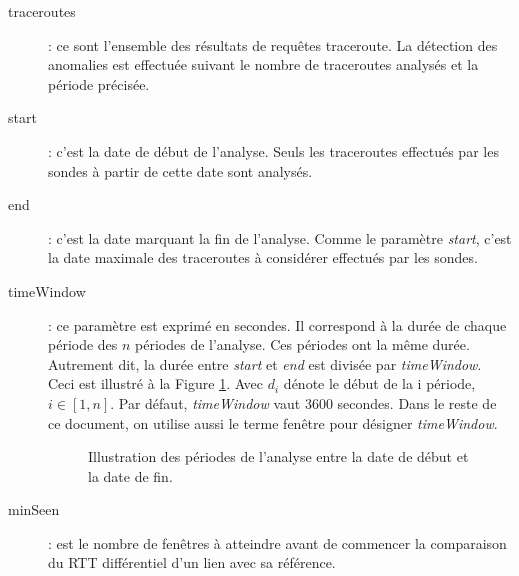 \begin{description}
	\item[traceroutes] : ce sont l'ensemble des résultats de requêtes traceroute. La détection des anomalies est effectuée suivant le nombre de traceroutes analysés et la période précisée. 
	\item[start] : c'est la date de début de l'analyse. Seuls les traceroutes effectués par les sondes  à partir de cette date sont analysés.
	\item[end]  : c'est la date marquant la fin de l'analyse. Comme le paramètre \textit{start}, c'est la date maximale des  traceroutes à considérer effectués par les sondes.
	\item[timeWindow]:  ce paramètre est exprimé en secondes. Il correspond à la durée de chaque période des $n$ périodes de l'analyse. Ces périodes ont la même durée. Autrement dit, la durée entre   \textit{start} et \textit{end} est divisée par \textit{timeWindow}. Ceci est illustré à la Figure  \ref{fig:timing_tex_}. Avec $d_i$ dénote le début de la i période,  $i \in [1,n]$. Par défaut, \textit{timeWindow} vaut $ 3600 $ secondes. Dans le reste de ce document, on utilise  aussi le terme fenêtre pour désigner \textit{timeWindow}.
	\begin{figure}[h]
		\centering
		\captionsetup{justification=centering}
		
		\caption{Illustration des périodes de l'analyse entre la date de début et la date de fin.}
		\label{fig:timing_tex_}
	\end{figure}
	\item[minSeen] : est le nombre de fenêtres à atteindre avant de commencer la comparaison du RTT différentiel d'un lien avec sa référence. 
	

\end{description}
